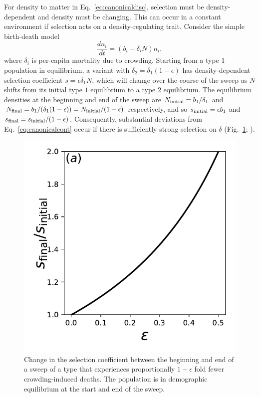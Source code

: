 \documentclass[12pt]{article}
\begin{document}
For density to matter in Eq.~\eqref{eq:canonicaldisc}, selection must be density-dependent and density must be changing. This can occur in a constant environment if selection acts on a density-regulating trait. Consider the simple birth-death model \citep{kostitzin_1939} 
\begin{equation}
\frac{d n_i}{dt}=(b_i -\delta_iN) n_i, \label{eq:simplebirthdeath}
\end{equation}
where $\delta_i$ is per-capita mortality due to crowding. Starting from a type $1$ population in equilibrium, a variant with $\delta_2=\delta_1(1-\epsilon)$ has density-dependent selection coefficient $s=\epsilon \delta_1 N$, which will change over the course of the sweep as $N$ shifts from its initial type $1$ equilibrium to a type $2$ equilibrium. The equilibrium densities at the beginning and end of the sweep are $N_{\rm initial}=b_1/\delta_1$ and $N_{\rm final}=b_1/(\delta_1(1-\epsilon))=N_{\rm initial}/(1-\epsilon)$ respectively, and so $s_{\rm initial}= \epsilon b_1$ and $s_{\rm final}=s_{\rm initial}/(1-\epsilon)$. Consequently, substantial deviations from Eq.~\eqref{eq:canonicalcont} occur if there is sufficiently strong selection on $\delta$ (Fig.~\ref{fig:strengthofselection}; \citealt{kimura_1978,kimura1969natural}). 

\begin{figure}
\centering
\includegraphics[scale=0.8]{strengthofselection.pdf}
\caption{\label{fig:strengthofselection} Change in the selection coefficient between the beginning and end of a sweep of a type that experiences proportionally $1-\epsilon$ fold fewer crowding-induced deaths. The population is in demographic equilibrium at the start and end of the sweep.}
\end{figure}
\end{document}
